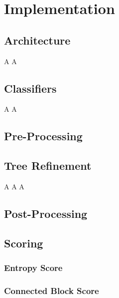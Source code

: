 \chapter{Implementation}

	\clearpage

	\section{Architecture}
	
		A\clearpage
		A\clearpage
	
	\section{Classifiers}
	
		A\clearpage
		A\clearpage
	
	\section{Pre-Processing}
	
		\clearpage
	
	\section{Tree Refinement}
	
		\clearpage
		A\clearpage
		A\clearpage
		A\clearpage
	
	\section{Post-Processing}
	
		\clearpage
	
	\section{Scoring}
	
		\subsection{Entropy Score}
		
			\clearpage
		
		\subsection{Connected Block Score}
		
			\clearpage
